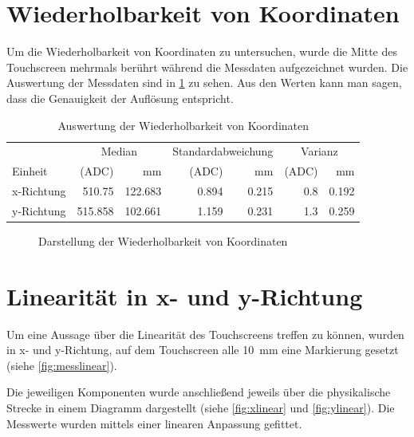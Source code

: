 \newpage

\section{Wiederholbarkeit von Koordinaten}
\label{ab:wiederholung}
Um die Wiederholbarkeit von Koordinaten zu untersuchen, wurde die Mitte des Touchscreen mehrmals berührt während die Messdaten aufgezeichnet wurden.
Die Auswertung der Messdaten sind in \cref{tab:wiederholung} zu sehen.
Aus den Werten kann man sagen, dass die Genauigkeit der Auflösung entspricht.
\begin{table}[ht!]
    \caption{Auswertung der Wiederholbarkeit von Koordinaten}
    \begin{center}
        \begin{tabular}{@{}lrrrrrr@{} }
            \toprule&\multicolumn{2}{c}{Median}& \multicolumn{2}{c}{Standardabweichung}&\multicolumn{2}{c}{Varianz} \\ 
            Einheit    &(ADC)              &mm             &(ADC)          &mm             &(ADC)      &mm\\\midrule
         x-Richtung & \SI{510,75}{}    & \SI{122,683}{}&\SI{0,894}{}   &\SI{0,215}{}   &\SI{0,8}{}     & \SI{0,192}{} \\  
         y-Richtung & \SI{515,858}{}    & \SI{102,661}{}&\SI{1,159}{}   &\SI{0,231}{}   &\SI{1,3}{}     & \SI{0,259}{} \\ \bottomrule 
        \end{tabular}
        \label{tab:wiederholung}
    \end{center}   
\end{table}


\begin{figure}[ht!]
    \centering
    
    \caption{Darstellung der Wiederholbarkeit von Koordinaten}
    \label{fig:wiederholung}
\end{figure}

\section{Linearität in x- und y-Richtung}
\label{ab:linear}
Um eine Aussage über die Linearität des Touchscreens treffen zu können, wurden in x- und y-Richtung, auf dem Touchscreen alle \SI{10}{mm} eine Markierung gesetzt (siehe \cref{fig:messlinear}).

Die jeweiligen Komponenten wurde anschließend jeweils über die physikalische Strecke in einem Diagramm dargestellt (siehe \cref{fig:xlinear} und \cref{fig:ylinear}).
Die Messwerte wurden mittels einer linearen Anpassung gefittet.

